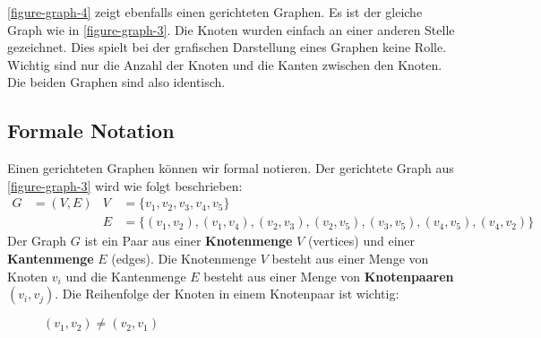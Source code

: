 \autoref{figure-graph-4} zeigt ebenfalls einen gerichteten Graphen. Es ist der gleiche Graph wie in \autoref{figure-graph-3}. Die Knoten wurden einfach an einer anderen Stelle gezeichnet. Dies spielt bei der grafischen Darstellung eines Graphen keine Rolle. Wichtig sind nur die Anzahl der Knoten und die Kanten zwischen den Knoten. Die beiden Graphen sind also identisch.

\subsection{Formale Notation}

Einen gerichteten Graphen können wir formal notieren. Der gerichtete Graph aus \autoref{figure-graph-3} wird wie folgt beschrieben:
\begin{align*}
G & = (V, E) & V & = \{v_1, v_2, v_3, v_4, v_5\} \\
& & E & = \{(v_1, v_2), (v_1, v_4), (v_2, v_3), (v_2, v_5), (v_3, v_5), (v_4, v_5), (v_4, v_2)\}
\end{align*}
Der Graph $G$ ist ein Paar aus einer \textbf{Knotenmenge} $V$ (vertices) und einer \textbf{Kantenmenge} $E$ (edges). Die Knotenmenge $V$ besteht aus einer Menge von Knoten $v_i$ und die Kantenmenge $E$ besteht aus einer Menge von \textbf{Knotenpaaren} $(v_i, v_j)$. Die Reihenfolge der Knoten in einem Knotenpaar ist wichtig:

\begin{figure}[htb]
\centering
\begin{minipage}[c]{0.45\textwidth}
\centering
{}
\caption*{$(v_1, v_2)$}
\end{minipage}
\begin{minipage}[c]{0.45\textwidth}
\centering
{}
\caption*{$(v_2, v_1)$}
\end{minipage}
\caption*{$(v_1, v_2) \neq (v_2, v_1)$}
\end{figure}

